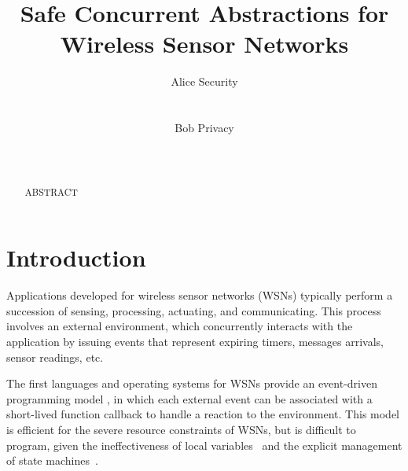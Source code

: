 \documentclass[10pt]{sensys-proc}
\author{
%
\alignauthor Alice Security \\
        \affaddr{Department of Computer Science}\\
        \affaddr{University of Southern California}\\
       \email{alice@example.edu}
\alignauthor Bob Privacy \\
    \affaddr{Networked Embedded Systems Group}\\
    \affaddr{Swedish Institute of Computer Science}\\
    \email{bob@example.se}
}
\title{Safe Concurrent Abstractions for Wireless Sensor Networks}
\begin{document}
\maketitle

\begin{abstract}
ABSTRACT
\end{abstract}




\section{Introduction}
\label{sec.intro}

\begin{comment}
TODO
Wireless sensor networks (WSNs) are composed of a large number of tiny devices 
(known as ``motes'') capable of sensing the environment and communicating among 
them.
WSNs are usually employed to continuously monitor physical phenomena in large 
or unreachable areas, such as wildfire in forests and air temperature in 
buildings.
Each mote features limited processing capabilities, a short-range radio link, 
and one or more sensors (e.g. light and temperature) \cite{wsn.survey}.
\end{comment}

Applications developed for wireless sensor networks (WSNs) typically perform a 
succession of sensing, processing, actuating, and communicating.
This process involves an external environment, which concurrently interacts 
with the application by issuing events that represent expiring timers, messages 
arrivals, sensor readings, etc.


The first languages and operating systems for WSNs provide an event-driven 
programming model \cite{wsn.tos,wsn.contiki}, in which each external event can
be associated with a short-lived function callback to handle a reaction to the 
environment.
This model is efficient for the severe resource constraints of WSNs, but is 
difficult to program, given the ineffectiveness of local 
variables~\cite{sync_async.cooperative} and the explicit management of state 
machines~\cite{wsn.protothreads}.
\end{document}
